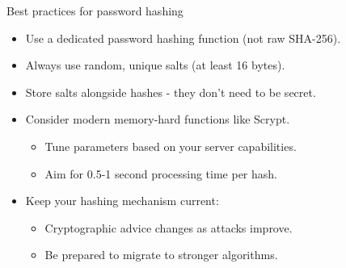 \documentclass[aspectratio=169, lualatex, handout]{beamer}
\begin{document}
\begin{frame}{Best practices for password hashing}
	\begin{itemize}[<+->]
		\item Use a dedicated password hashing function (not raw SHA-256).
		\item Always use random, unique salts (at least 16 bytes).
		\item Store salts alongside hashes - they don't need to be secret.
		\item Consider modern memory-hard functions like Scrypt.
		      \begin{itemize}
			      \item Tune parameters based on your server capabilities.
			      \item Aim for 0.5-1 second processing time per hash.
		      \end{itemize}
		\item Keep your hashing mechanism current:
		      \begin{itemize}
			      \item Cryptographic advice changes as attacks improve.
			      \item Be prepared to migrate to stronger algorithms.
		      \end{itemize}
	\end{itemize}
\end{frame}
\end{document}
